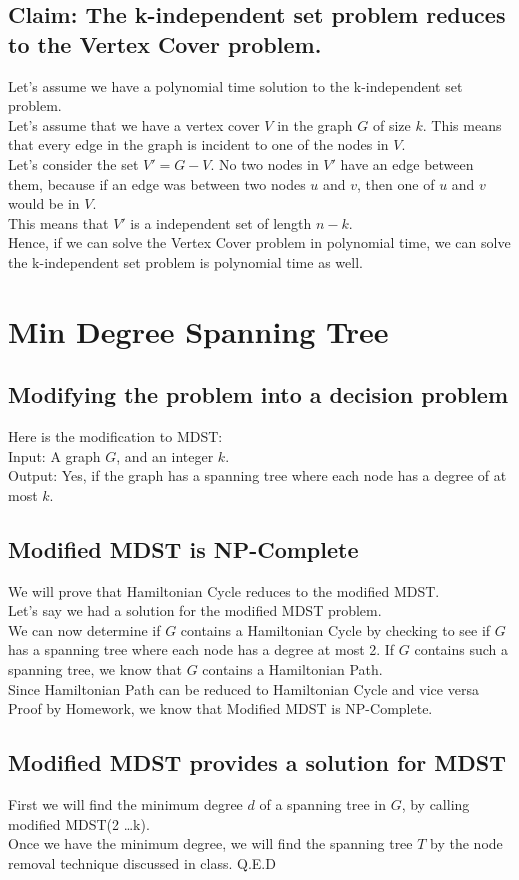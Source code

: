 \documentclass[10pt,twocolumn]{article}
\begin{document}
\subsection{Claim: The k-independent set problem reduces to the Vertex Cover problem.}
Let's assume we have a polynomial time solution to the k-independent set problem.\\
Let's assume that we have a vertex cover $V$ in the graph $G$ of size $k$. This means that every edge in the graph is incident to one of the nodes in $V$. \\
Let's consider the set $V' = G - V$. No two nodes in $V'$ have an edge between them, because if an edge was between two nodes $u$ and $v$, then one of $u$ and $v$ would be in $V$.\\
This means that $V'$ is a independent set of length $n-k$.\\
Hence, if we can solve the Vertex Cover problem in polynomial time, we can solve the k-independent set problem is polynomial time as well.

\section{ Min Degree Spanning Tree }
\subsection{Modifying the problem into a decision problem}
Here is the modification to MDST:\\
Input: A graph $G$, and an integer $k$.\\
Output: Yes, if the graph has a spanning tree where each node has a degree of at most $k$.\\
\subsection{Modified MDST is NP-Complete}
We will prove that Hamiltonian Cycle reduces to the modified MDST.\\
Let's say we had a solution for the modified MDST problem.\\
We can now determine if $G$ contains a Hamiltonian Cycle by checking to see if $G$ has a spanning tree where each node has a degree at most 2. If $G$ contains such a spanning tree, we know that $G$ contains a Hamiltonian Path.\\
Since Hamiltonian Path can be reduced to Hamiltonian Cycle and vice versa {Proof by Homework}, we know that Modified MDST is NP-Complete.
\subsection{Modified MDST provides a solution for MDST}
First we will find the minimum degree $d$ of a spanning tree in $G$, by calling modified MDST(2 \dots k).\\
Once we have the minimum degree, we will find the spanning tree $T$ by the node removal technique discussed in class.
Q.E.D
\end{document}
